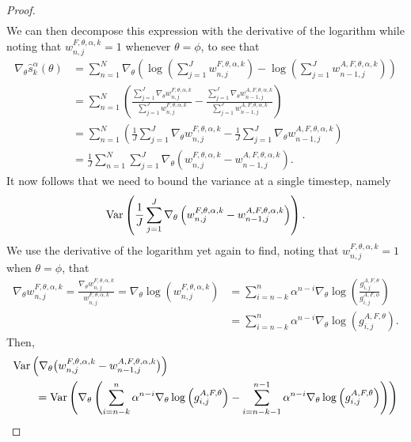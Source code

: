 \begin{proof}
\begin{eqnarray}
\end{eqnarray}
We can then decompose this expression with the derivative of the logarithm while noting that $w_{n,j}^{F,\theta,\alpha,k} = 1$ whenever $\theta=\phi$, to see that
\begin{align}
    \nabla_\theta \hat s_k^\alpha(\theta) 
    &= \sum_{n=1}^N \nabla_\theta \left(\log\left(\sum_{j=1}^J w_{n,j}^{F,\theta,\alpha,k}\right)-\log\left(\sum_{j=1}^J w_{n-1,j}^{A, F,\theta, \alpha, k}\right)\right) \\
    &= \sum_{n=1}^N \left(\frac{\sum_{j=1}^J \nabla_\theta w_{n,j}^{F,\theta,\alpha,k}}{\sum_{j=1}^J w_{n,j}^{F,\theta,\alpha,k}}-\frac{\sum_{j=1}^J \nabla_\theta w_{n-1,j}^{A,F,\theta,\alpha, k}}{\sum_{j=1}^J w_{n-1,j}^{A,F,\theta,\alpha, k}}\right) \\
    &= \sum_{n=1}^N \left(\frac{1}{J}\sum_{j=1}^J \nabla_\theta w_{n,j}^{F,\theta,\alpha,k}-\frac{1}{J}\sum_{j=1}^J \nabla_\theta w_{n-1,j}^{A,F,\theta,\alpha, k}\right)\\
    &= \frac{1}{J}\sum_{n=1}^N \sum_{j=1}^J \nabla_\theta \left(w_{n,j}^{F,\theta,\alpha,k}- w_{n-1,j}^{A,F,\theta,\alpha, k}\right).
\end{align}
It now follows that we need to bound the variance at a single timestep, namely
\begin{equation}
\mathrm{Var}\left(\frac{1}{J}\sum_{j=1}^J\nabla_\theta \left(w_{n,j}^{F,\theta,\alpha,k}- w_{n-1,j}^{A,F,\theta,\alpha, k}\right)\right).
\end{equation}
We use the derivative of the logarithm yet again to find, noting that $w_{n,j}^{F,\theta,\alpha,k}=1$ when $\theta=\phi$, that
\begin{align}
    \nabla_\theta w_{n,j}^{F,\theta,\alpha,k} = \frac{\nabla_\theta w_{n,j}^{F,\theta,\alpha,k}}{w_{n,j}^{F,\theta,\alpha,k}} = \nabla_\theta \log(w_{n,j}^{F,\theta,\alpha,k}) &= \sum_{i=n-k}^n \alpha^{n-i} \nabla_\theta \log\left(\frac{g_{i,j}^{A,F,\theta}}{g_{i,j}^{A,F,\phi}} \right) 
    \\
    &= \sum_{i=n-k}^n \alpha^{n-i} \nabla_\theta \log\left(g_{i,j}^{A,F,\theta}\right).
\end{align}
Then,
\begin{align}
    &\Var\left(\nabla_\theta \big(w_{n,j}^{F,\theta,\alpha,k}- w_{n-1,j}^{A,F,\theta,\alpha, k}\big)\right) 
    \\
    &\qquad = \Var\left(\nabla_\theta \left(\sum_{i=n-k}^n \alpha^{n-i} \nabla_\theta \log\left(g_{i,j}^{A,F,\theta}\right)- \sum_{i=n-k-1}^{n-1} \alpha^{n-i} \nabla_\theta \log\left(g_{i,j}^{A,F,\theta}\right)\right)\right) \\

\end{align}
\end{proof}
